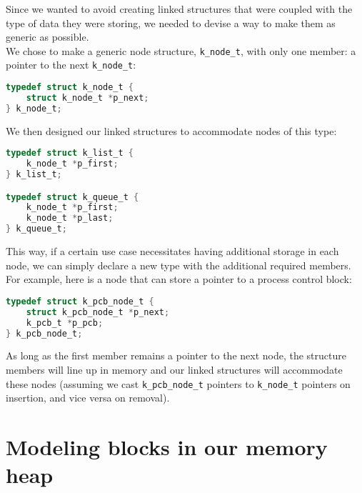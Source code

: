 \documentclass[12pt]{report}
\begin{document}
Since we wanted to avoid creating linked structures that were coupled with the type of data they were storing, we needed to devise a way to make them as generic as possible.\\

We chose to make a generic node structure, \texttt{k_node_t}, with only one member: a pointer to the next \texttt{k_node_t}:

\begin{minipage}{\textwidth}
\begin{lstlisting}[language=C]
typedef struct k_node_t {
    struct k_node_t *p_next;
} k_node_t;
\end{lstlisting}
\end{minipage}

We then designed our linked structures to accommodate nodes of this type:

\begin{minipage}{\textwidth}
\begin{lstlisting}[language=C]
typedef struct k_list_t {
    k_node_t *p_first;
} k_list_t;

typedef struct k_queue_t {
    k_node_t *p_first;
    k_node_t *p_last;
} k_queue_t;
\end{lstlisting}
\end{minipage}

This way, if a certain use case necessitates having additional storage in each node, we can simply declare a new type with the additional required members. For example, here is a node that can store a pointer to a process control block:

\begin{minipage}{\textwidth}
\begin{lstlisting}[language=C]
typedef struct k_pcb_node_t {
    struct k_pcb_node_t *p_next;
    k_pcb_t *p_pcb;
} k_pcb_node_t;
\end{lstlisting}
\end{minipage}

As long as the first member remains a pointer to the next node, the structure members will line up in memory and our linked structures will accommodate these nodes (assuming we cast \texttt{k_pcb_node_t} pointers to \texttt{k_node_t} pointers on insertion, and vice versa on removal).

\section{Modeling blocks in our memory heap}
\end{document}
